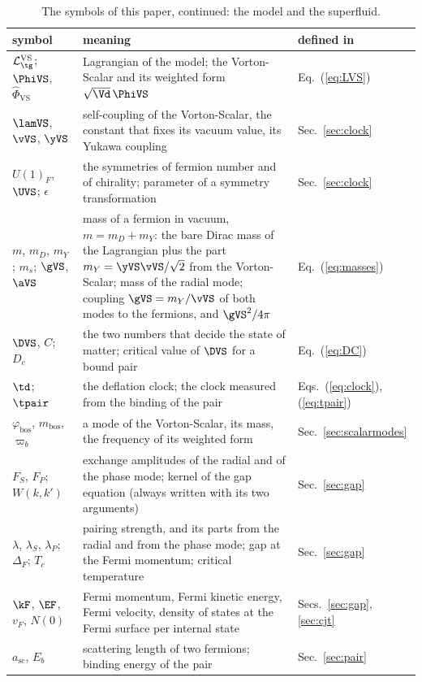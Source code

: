 \begin{table}
\caption{\label{tab:symbols2}The symbols of this paper, continued: the model and the superfluid.}
\begin{ruledtabular}
\begin{tabular}{p{}p{}p{}}
symbol & meaning & defined in \\
\hline
$\mathcal L_{\tg}^{\mathrm{VS}}$; $\PhiVS$, $\hat\Phi_{\mathrm{VS}}$ & Lagrangian of the model; the Vorton-Scalar and its weighted form $\sqrt{\Vd}\,\PhiVS$ & Eq.~(\ref{eq:LVS}) \\
$\lamVS$, $\vVS$, $\yVS$ & self-coupling of the Vorton-Scalar, the constant that fixes its vacuum value, its Yukawa coupling & Sec.~\ref{sec:clock} \\
$U(1)_F$, $\UVS$; $\epsilon$ & the symmetries of fermion number and of chirality; parameter of a symmetry transformation & Sec.~\ref{sec:clock} \\
$m$, $m_D$, $m_Y$; $m_s$; $\gVS$, $\aVS$ & mass of a fermion in vacuum, $m=m_D+m_Y$: the bare Dirac mass of the Lagrangian plus the part $m_Y=\yVS\vVS/\sqrt2$ from the Vorton-Scalar; mass of the radial mode; coupling $\gVS=m_Y/\vVS$ of both modes to the fermions, and $\gVS^{2}/4\pi$ & Eq.~(\ref{eq:masses}) \\
$\DVS$, $C$; $D_c$ & the two numbers that decide the state of matter; critical value of $\DVS$ for a bound pair & Eq.~(\ref{eq:DC}) \\
$\td$; $\tpair$ & the deflation clock; the clock measured from the binding of the pair & Eqs.~(\ref{eq:clock}), (\ref{eq:tpair}) \\
$\varphi_{\mathrm{bos}}$, $m_{\mathrm{bos}}$, $\varpi_b$ & a mode of the Vorton-Scalar, its mass, the frequency of its weighted form & Sec.~\ref{sec:scalarmodes} \\
$F_S$, $F_P$; $W(k,k')$ & exchange amplitudes of the radial and of the phase mode; kernel of the gap equation (always written with its two arguments) & Sec.~\ref{sec:gap} \\
$\lambda$, $\lambda_S$, $\lambda_P$; $\Delta_F$; $T_c$ & pairing strength, and its parts from the radial and from the phase mode; gap at the Fermi momentum; critical temperature & Sec.~\ref{sec:gap} \\
$\kF$, $\EF$, $v_F$, $N(0)$ & Fermi momentum, Fermi kinetic energy, Fermi velocity, density of states at the Fermi surface per internal state & Secs.~\ref{sec:gap}, \ref{sec:cjt} \\
$a_{\mathrm{sc}}$, $E_b$ & scattering length of two fermions; binding energy of the pair & Sec.~\ref{sec:pair} \\

\end{tabular}
\end{ruledtabular}
\end{table}
